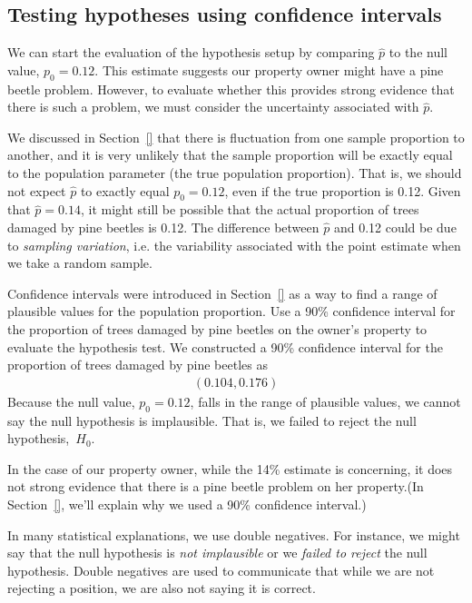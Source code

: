 \subsection{Testing hypotheses using confidence intervals}
\label{utilizingOurCI}

We can start the evaluation of the hypothesis setup by comparing $\hat{p}$ to the null value, $p_0 = 0.12$. This estimate suggests our property owner might have a pine beetle problem. However, to evaluate whether this provides strong evidence that there is such a problem, we must consider the uncertainty associated with $\hat{p}$.

We discussed in Section~\ref{} that there is fluctuation from one sample proportion to another, and it is very unlikely that the sample proportion will be exactly equal to the population parameter (the true population proportion). That is, we should not expect $\hat{p}$ to exactly equal $p_0 = 0.12$, even if the true proportion is 0.12. Given that $\hat{p} = 0.14$, it might still be possible that the actual proportion of trees damaged by pine beetles is 0.12. The difference between $\hat{p}$ and 0.12 could be due to \emph{sampling variation}, i.e. the variability associated with the point estimate when we take a random sample.

\begin{example}{Confidence intervals were introduced in Section~\ref{} as a way to find a range of plausible values for the population proportion. Use a 90\% confidence interval for the proportion of trees damaged by pine beetles on the owner's property to evaluate the hypothesis test.}
We constructed a 90\% confidence interval for the proportion of trees damaged by pine beetles as
\begin{eqnarray*}
(0.104, 0.176)
\end{eqnarray*}
Because the null value, $p_0 = 0.12$, falls in the range of plausible values, we cannot say the null hypothesis is implausible. That is, we failed to reject the null hypothesis,~$H_0$.

In the case of our property owner, while the 14\% estimate is concerning, it does not strong evidence that there is a pine beetle problem on her property.(In Section~\ref{}, we'll explain why we used a 90\% confidence interval.)
\end{example}

\begin{tipBox}{
In many statistical explanations, we use double negatives. For instance, we might say that the null hypothesis is \emph{not implausible} or we \emph{failed to reject} the null hypothesis. Double negatives are used to communicate that while we are not rejecting a position, we are also not saying it is correct.}
\end{tipBox}

